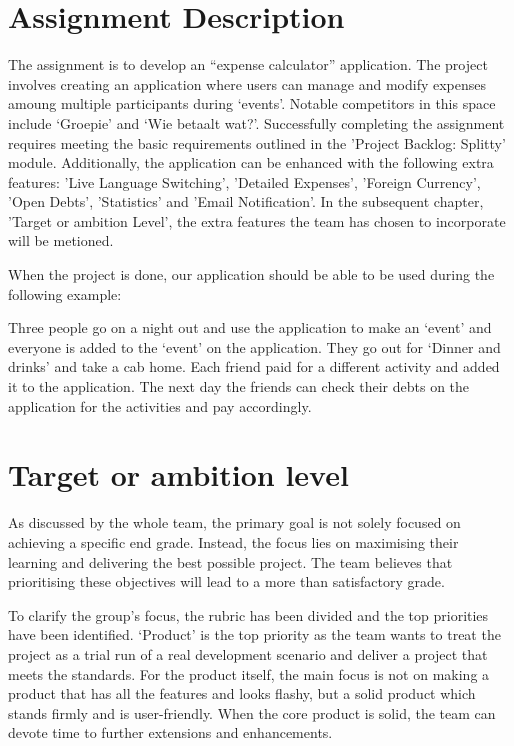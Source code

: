 \documentclass[sigconf,nonacm]{acmart}
\begin{document}
\section{Assignment Description}
The assignment is to develop an “expense calculator” application. The project involves creating an application where users can manage and modify expenses amoung multiple participants during ‘events’. Notable competitors in this space include ‘Groepie’ and ‘Wie betaalt wat?’. Successfully completing the assignment requires meeting the basic requirements outlined in the 'Project Backlog: Splitty' module. Additionally, the application can be enhanced with the following extra features: 'Live Language Switching', 'Detailed Expenses', 'Foreign Currency', 'Open Debts', 'Statistics' and 'Email Notification'. In the subsequent chapter, 'Target or ambition Level', the extra features the team has chosen to incorporate will be metioned.

When the project is done, our application should be able to be used during the following example:

Three people go on a night out and use the application to make an ‘event’ and everyone is added to the ‘event’ on the application. They go out for ‘Dinner and drinks’ and take a cab home. Each friend paid for a different activity and added it to the application. The next day the friends can check their debts on the application for the activities and pay accordingly.

\section{Target or ambition level}
As discussed by the whole team, the primary goal is not solely focused on achieving a specific end grade. Instead, the focus lies on maximising their learning and delivering the best possible project. The team believes that prioritising these objectives will lead to a more than satisfactory grade.

To clarify the group’s focus, the rubric has been divided and the top priorities have been identified. ‘Product’ is the top priority as the team wants to treat the project as a trial run of a real development scenario and deliver a project that meets the standards. For the product itself, the main focus is not on making a product that has all the features and looks flashy, but a solid product which stands firmly and is user-friendly.
When the core product is solid, the team can devote time to further extensions and enhancements.
\end{document}
